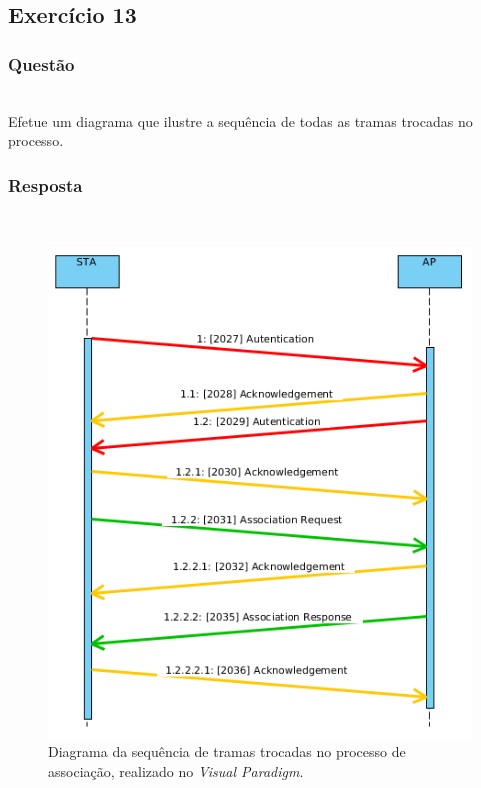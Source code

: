 \documentclass{llncs}
\begin{document}
\clearpage
\subsection{Exercício 13}
\subsubsection{Questão}\rule[-10pt]{0pt}{10pt}\\

Efetue um diagrama que ilustre a sequência de todas as tramas trocadas no processo.

\subsubsection{Resposta}\rule[-10pt]{0pt}{10pt}\\

\begin{figure}
  \begin{center}
  \includegraphics[scale=0.6]{./imagens/diag_assoc_seq.png} 
  \end{center}
  \caption{Diagrama da sequência de tramas trocadas no processo de associação, realizado no \textit{Visual Paradigm}.}
  \label{fig:diag_assoc_seq}
\end{figure}
\end{document}
